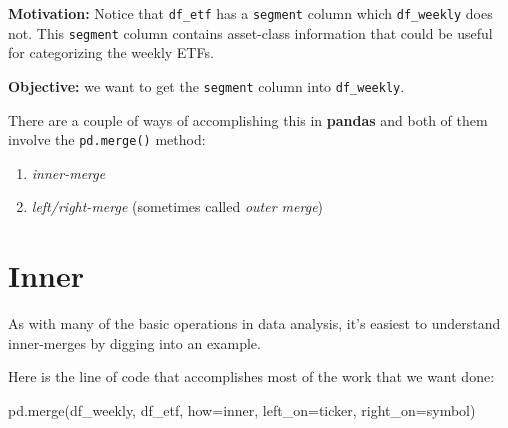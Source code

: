 \documentclass[
  letterpaper,
  DIV=11,
  numbers=noendperiod]{scrreprt}
\newenvironment{Shaded}{\begin{snugshade}}{\end{snugshade}}
\newcommand{\NormalTok}[1]{\textcolor[rgb]{0.00,0.23,0.31}{#1}}
\newcommand{\OperatorTok}[1]{\textcolor[rgb]{0.37,0.37,0.37}{#1}}
\newcommand{\StringTok}[1]{\textcolor[rgb]{0.13,0.47,0.30}{#1}}
\begin{document}
\textbf{Motivation:} Notice that \texttt{df\_etf} has a \texttt{segment}
column which \texttt{df\_weekly} does not. This \texttt{segment} column
contains asset-class information that could be useful for categorizing
the weekly ETFs.

\textbf{Objective:} we want to get the \texttt{segment} column into
\texttt{df\_weekly}.

There are a couple of ways of accomplishing this in \textbf{pandas} and
both of them involve the \texttt{pd.merge()} method:

\begin{enumerate}
\def\labelenumi{\arabic{enumi}.}
\item
  \emph{inner-merge}
\item
  \emph{left/right-merge} (sometimes called \emph{outer merge})
\end{enumerate}

\hypertarget{inner}{%
\section{Inner}\label{inner}}

As with many of the basic operations in data analysis, it's easiest to
understand inner-merges by digging into an example.

Here is the line of code that accomplishes most of the work that we want
done:

\begin{Shaded}
\begin{Highlighting}[]
\NormalTok{pd.merge(df\_weekly, df\_etf, how}\OperatorTok{=}\StringTok{\textquotesingle{}inner\textquotesingle{}}\NormalTok{, left\_on}\OperatorTok{=}\StringTok{\textquotesingle{}ticker\textquotesingle{}}\NormalTok{, right\_on}\OperatorTok{=}\StringTok{\textquotesingle{}symbol\textquotesingle{}}\NormalTok{)}
\end{Highlighting}
\end{Shaded}
\end{document}
